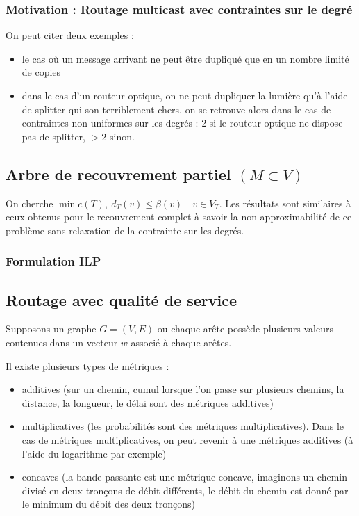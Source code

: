 \documentclass[a4paper,11pt]{thesis}
\begin{document}
{\subsubsection{Motivation : Routage multicast avec contraintes sur le degr\'e}

On peut citer deux exemples :
\begin{itemize}
    \item le cas où un message arrivant ne peut être dupliqué que en un nombre limité de copies
    \item dans le cas d'un routeur optique, on ne peut dupliquer la lumière qu'à l'aide de splitter
        qui son terriblement chers, on se retrouve alors dans le cas de contraintes non uniformes
        sur les degrés : $2$ si le routeur optique ne dispose pas de splitter, $>2$ sinon.
\end{itemize}

\subsection{Arbre de recouvrement partiel $(M \subset V)$}

On cherche $\min c(T),\ d_T(v) \leq \beta(v) \quad v \in V_T$. 
Les résultats sont similaires à ceux obtenus pour le recouvrement complet à savoir la non
approximabilité de ce problème sans relaxation de la contrainte sur les degrés.

\subsubsection{Formulation ILP}


\subsection{Routage avec qualit\'e de service}

Supposons un graphe $G=(V,E)$ ou chaque arête possède plusieurs valeurs contenues dans un vecteur
$w$ associé à chaque arêtes.

Il existe plusieurs types de métriques : \begin{itemize}
    \item additives (sur un chemin, cumul lorsque l'on passe sur plusieurs chemins, la distance, la
        longueur, le délai sont des métriques additives)
    \item multiplicatives (les probabilités sont des métriques multiplicatives). Dans le cas de
        métriques multiplicatives, on peut revenir à une métriques additives (à l'aide du logarithme
        par exemple)
    \item concaves (la bande passante est une métrique concave, imaginons un chemin divisé en deux
        tronçons de débit différents, le débit du chemin est donné par le minimum du débit des deux
        tronçons)
\end{itemize}

}
\end{document}
